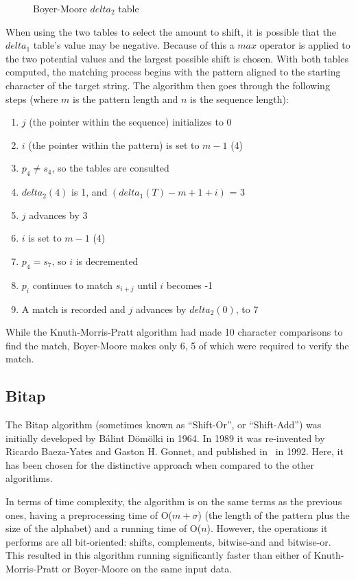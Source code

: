 \begin{figure}[ht]
\centering

\caption{Boyer-Moore $delta_2$ table}
\label{fig:bm_good_suffix}
\end{figure}

When using the two tables to select the amount to shift, it is possible that the $delta_1$ table's value may be negative. Because of this a $max$ operator is applied to the two potential values and the largest possible shift is chosen. With both tables computed, the matching process begins with the pattern aligned to the starting character of the target string. The algorithm then goes through the following steps (where $m$ is the pattern length and $n$ is the sequence length):

\begin{enumerate}
\item $j$ (the pointer within the sequence) initializes to 0
\item $i$ (the pointer within the pattern) is set to $m - 1$ (4)
\item $p_4 \neq s_4$, so the tables are consulted
\item $delta_2(4)$ is 1, and $(delta_1(T) - m + 1 + i)$ = 3
\item $j$ advances by 3
\item $i$ is set to $m - 1$ (4)
\item $p_4 = s_7$, so $i$ is decremented
\item $p_i$ continues to match $s_{i+j}$ until $i$ becomes -1
\item A match is recorded and $j$ advances by $delta_2(0)$, to 7
\end{enumerate}

While the Knuth-Morris-Pratt algorithm had made 10 character comparisons to find the match, Boyer-Moore makes only 6, 5 of which were required to verify the match.

\subsection{Bitap}

The Bitap algorithm (sometimes known as ``Shift-Or'', or ``Shift-Add'') was initially developed by B\'{a}lint D\"{o}m\"{o}lki in 1964. In 1989 it was re-invented by Ricardo Baeza-Yates and Gaston H. Gonnet, and published in~\cite{baeza.yates.gonnet.1992} in 1992. Here, it has been chosen for the distinctive approach when compared to the other algorithms.

In terms of time complexity, the algorithm is on the same terms as the previous ones, having a preprocessing time of O($m+\sigma$) (the length of the pattern plus the size of the alphabet) and a running time of O($n$). However, the operations it performs are all bit-oriented: shifts, complements, bitwise-and and bitwise-or. This resulted in this algorithm running significantly faster than either of Knuth-Morris-Pratt or Boyer-Moore on the same input data.


